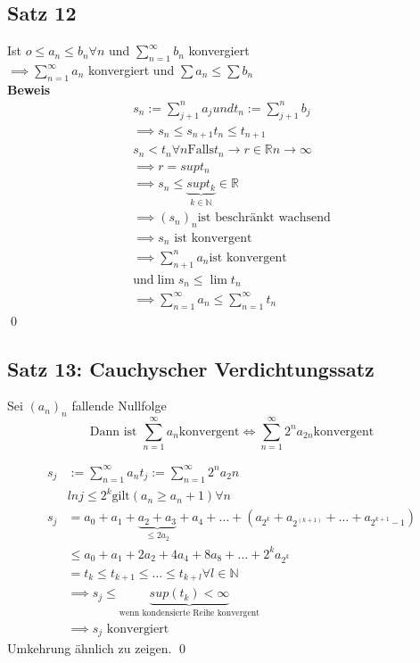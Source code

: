 \documentclass[fleqn]{scrbook}
\newcommand{\R}{\mathbb{R}}
\newcommand{\N}{\mathbb{N}}
\newcommand{\sumOI}{\sum_{n=1}^{\infty}}
\renewenvironment{proof}{{\bfseries Beweis }}{\qed}
\begin{document}
\subsection{Satz 12}
Ist $o \le a_n \le b_n \forall n$ und $\sumOI b_n$ konvergiert \\
$ \implies \sumOI a_n$ konvergiert und $ \sum a_n \le \sum b_n$ \\
\begin{proof}
 \begin{equation}
  \begin{split}
    s_n := \sum_{j+1}^n a_j und t_n := \sum_{j+1}^n b_j \\
    \implies s_n \le s_{n+1} t_n \le t_{n+1} \\
    s_n < t_n \forall n 
    \text{Falls} t_n \to r \in \R n \to \infty \\
    \implies r = sup t_n \\
    \implies s_n \le \underbrace{sup t_k}_{k \in \N} \in \R \\
    \implies (s_n)_n \text{ist beschränkt wachsend} \\
    \implies s_n \text{ ist konvergent} \\
    \implies \sum_{n+1}^n a_n \text{ist konvergent} \\
    \text{und} \lim s_n \le \lim t_n \\
    \implies \sumOI a_n \le \sumOI t_n
   \end{split}
 \end{equation}
\end{proof}

\subsection{Satz 13: Cauchyscher Verdichtungssatz}
Sei $(a_n)_n$ fallende Nullfolge
\begin{equation}
 \text{Dann ist } \sumOI a_n \text{konvergent} \Leftrightarrow \sumOI 2^n a_{2n} \text{konvergent}
\end{equation}

\begin{proof}
 \begin{equation}
  \begin{split}
   s_j & := \sumOI a_n t_j := \sumOI 2^n a_2n \\
   & ln  j \le 2^k \text{gilt} (a_n \ge a_n+1) \forall n \\
   s_j &= a_0 + a_1 + \underbrace{a_2 + a_3}_{\le 2a_2} + a_4 + \ldots + (a_{2^k} + a_{2^(k+1)} + \ldots + a_{2^{k+1}-1}) \\
   & \le a_0 + a_1 + 2a_2 + 4 a_4 + 8 a_8 + \ldots + 2^k a_{2^k} \\
   & =t_k \le t_{k+1} \le \ldots \le t_{k+l} \forall l \in \N \\
   & \implies s_j \le \underbrace{sup(t_k) < \infty}_{\text{wenn kondensierte Reihe konvergent}} \\
   & \implies s_j \text{ konvergiert}
  \end{split}
 \end{equation}
Umkehrung ähnlich zu zeigen.
\end{proof}
\end{document}
